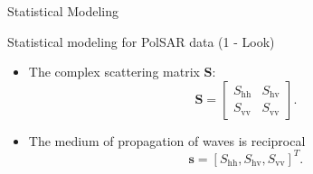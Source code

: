 \documentclass[10pt,professionalfonts]{beamer}
\begin{document}

\begin{frame}[fragile]{Statistical Modeling}
\begin{alertblock}{Statistical modeling for PolSAR data (1 - Look)}
\begin{itemize}
\item The complex scattering matrix $\mathbf{S}$:
\begin{equation}
\mathbf{S} = \left[
\begin{array}{cc}
	S_\text{hh}   & S_\text{hv}   \\
	S_\text{vv}   & S_\text{vv}   
\end{array}
\right].
\end{equation}\label{eq_01}
\item The medium of propagation of waves is reciprocal
$$\mathbf{s}=[S_\text{hh},S_\text{hv},S_{\text{vv}}]^T.$$
\end{itemize}
\end{alertblock}
\end{frame}
\end{document}
